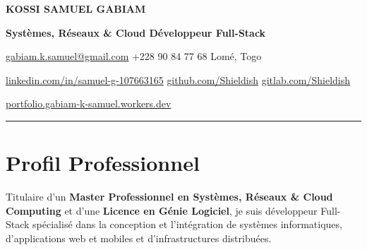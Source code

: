 \documentclass[10pt,a4paper]{article}
\begin{document}

\begin{center}

{\LARGE\bfseries\scshape KOSSI SAMUEL GABIAM}

\par
\vspace{3pt}

{\normalsize\bfseries
Systèmes, Réseaux \& Cloud
\textbullet{}
Développeur Full-Stack}

\par
\vspace{5pt}

{\small
\href{mailto:gabiam.k.samuel@gmail.com}
{gabiam.k.samuel@gmail.com}
\quad
\textbullet
\quad
+228 90 84 77 68
\quad
\textbullet
\quad
Lomé, Togo
}

\par
\vspace{2pt}

{\small
\href{https://www.linkedin.com/in/samuel-g-107663165/}
{linkedin.com/in/samuel-g-107663165}
\quad
\textbullet
\quad
\href{https://github.com/Shieldish}
{github.com/Shieldish}
\quad
\textbullet
\quad
\href{https://gitlab.com/Shieldish}
{gitlab.com/Shieldish}
}

\par
\vspace{2pt}

{\small
\href{https://portfolio.gabiam-k-samuel.workers.dev/}
{portfolio.gabiam-k-samuel.workers.dev}
}

\end{center}

\vspace{-2pt}

\noindent
{\color{sectioncolor}\rule{\linewidth}{1pt}}

\vspace{2pt}


\section{Profil Professionnel}

Titulaire d'un \textbf{Master Professionnel en Systèmes, Réseaux \& Cloud Computing}
et d'une \textbf{Licence en Génie Logiciel}, je suis développeur Full-Stack
spécialisé dans la conception et l'intégration de systèmes informatiques,
d'applications web et mobiles et d'infrastructures distribuées.
\end{document}
